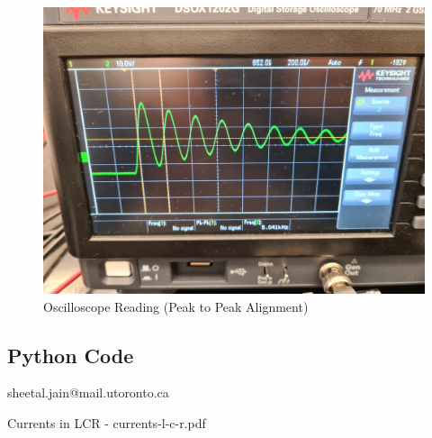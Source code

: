 \documentclass[a4paper,12pt]{article}
\begin{document}
\begin{figure}[H]
  \centering
  \includegraphics[width=0.9\linewidth]{../data/20211116_110834.jpg}
  \begin{center}
    \begin{center}   
    \end{center}  \end{center}
  \caption{Oscilloscope Reading (Peak to Peak Alignment)}
  \label{osc}
\end{figure}

\pagebreak

\subsection{Python Code}

sheetal.jain@mail.utoronto.ca

\pagebreak

\begin{thebibliography}{99}

 Currents in LCR - currents-l-c-r.pdf

\end{thebibliography}
\end{document}
